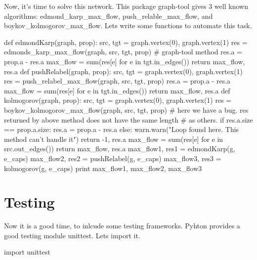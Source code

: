 \documentclass[10pt,a4paper]{article}%
\begin{document}
\nwenddocs{}Now, it's time to solve this network. This package {\Tt{}graph-tool\nwendquote} gives 3
    well known algorithms: {\Tt{}edmond{\_}karp{\_}max{\_}flow\nwendquote}, {\Tt{}push{\_}relable{\_}max{\_}flow\nwendquote},
    and {\Tt{}boykov{\_}kolmogorov{\_}max{\_}flow\nwendquote}. Lets write some functions to automate
    this task.

\nwenddocs{}\endmoddef\nwstartdeflinemarkup\nwenddeflinemarkup
def edmondKarp(graph, prop):
    src, tgt = graph.vertex(0), graph.vertex(1)
    res = edmonds_karp_max_flow(graph, src, tgt, prop) # graph-tool method
    res.a = prop.a - res.a
    max_flow = sum(res[e] for e in tgt.in_edges())
    return max_flow, res.a
\eatline
\nwendcode{}\nwdocspar
\nwenddocs{}\plusendmoddef\nwstartdeflinemarkup\nwenddeflinemarkup
def pushRelabel(graph, prop):
    src, tgt = graph.vertex(0), graph.vertex(1)
    res = push_relabel_max_flow(graph, src, tgt, prop)
    res.a = prop.a - res.a
    max_flow = sum(res[e] for e in tgt.in_edges())
    return max_flow, res.a
\eatline
\nwendcode{}\nwdocspar
\nwenddocs{}\plusendmoddef\nwstartdeflinemarkup\nwenddeflinemarkup
def kolmogorov(graph, prop):
    src, tgt = graph.vertex(0), graph.vertex(1)
    res = boykov_kolmogorov_max_flow(graph, src, tgt, prop)
    # here we have a bug. res returned by above method does not have the same length
    # as others.
    if res.a.size == prop.a.size:
         res.a = prop.a - res.a
    else:
        warn.warn("Loop found here. This method can't handle it")
        return -1, res.a
    max_flow = sum(res[e] for e in src.out_edges())
    return max_flow, res.a
\nwendcode{}\nwdocspar
\nwenddocs{}\endmoddef\nwstartdeflinemarkup\nwenddeflinemarkup
max_flow1, res1 = edmondKarp(g, e_caps)
max_flow2, res2 = pushRelabel(g, e_caps)
max_flow3, res3 = kolmogorov(g, e_caps)
print max_flow1, max_flow2, max_flow3

\nwendcode{}\section{Testing} 
 
    Now it is a good time, to inlcude some testing
    frameworks. Pyhton provides a good testing module {\Tt{}unittest\nwendquote}. Lets import
    it.

\nwenddocs{}\plusendmoddef\nwstartdeflinemarkup\nwenddeflinemarkup
import unittest
\end{document}
